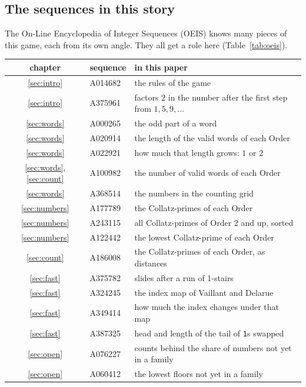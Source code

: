 \documentclass[10pt,a4paper,titlepage]{article}
\makeatletter
\newenvironment{herefloat}[1]
  {\par\addvspace{\intextsep}\noindent\begin{minipage}{\linewidth}%
   \def\@captype{#1}\centering}
  {\end{minipage}\par\nopagebreak\vspace{\intextsep}}
\makeatother
\begin{document}
\subsection*{The sequences in this story}

The On-Line Encyclopedia of Integer Sequences (OEIS) knows many pieces of this
game, each from its own angle. They all get a role here (Table~\ref{tab:oeis}).

\nopagebreak
\begin{herefloat}{table}
\small
\begin{tabular}{@{}c l l@{}}
\toprule
chapter & sequence & in this paper \\
\midrule
\ref{sec:intro} & A014682\index{OEIS!A014682} & the rules of the game \\
\ref{sec:intro} & A375961\index{OEIS!A375961} & factors $2$ in the number after the first step from $1, 5, 9, \dots$ \\
\ref{sec:words} & A000265\index{OEIS!A000265} & the odd part of a word \\
\ref{sec:words} & A020914\index{OEIS!A020914} & the length of the valid words of each Order \\
\ref{sec:words} & A022921\index{OEIS!A022921} & how much that length grows: $1$ or $2$ \\
\ref{sec:words}, \ref{sec:count} & A100982\index{OEIS!A100982} & the number of valid words of each Order \\
\ref{sec:words} & A368514\index{OEIS!A368514} & the numbers in the counting grid \\
\ref{sec:numbers} & A177789\index{OEIS!A177789} & the Collatz-primes of each Order \\
\ref{sec:numbers} & A243115\index{OEIS!A243115} & all Collatz-primes of Order $2$ and up, sorted \\
\ref{sec:numbers} & A122442\index{OEIS!A122442} & the lowest Collatz-prime of each Order \\
\ref{sec:count} & A186008\index{OEIS!A186008} & the Collatz-primes of each Order, as distances \\
\ref{sec:fast} & A375782\index{OEIS!A375782} & slides after a run of 1-stairs \\
\ref{sec:fast} & A324245\index{OEIS!A324245} & the index map of Vaillant and Delarue \\
\ref{sec:fast} & A349414\index{OEIS!A349414} & how much the index changes under that map \\
\ref{sec:fast} & A387325\index{OEIS!A387325} & head and length of the tail of \texttt{1}s swapped \\
\ref{sec:open} & A076227\index{OEIS!A076227} & counts behind the share of numbers not yet in a family \\
\ref{sec:open} & A060412\index{OEIS!A060412} & the lowest floors not yet in a family \\
\bottomrule
\end{tabular}
\caption{The OEIS sequences in this paper, by chapter; the words in the last column are
explained in the chapter named.}
\label{tab:oeis}
\end{herefloat}
\end{document}
